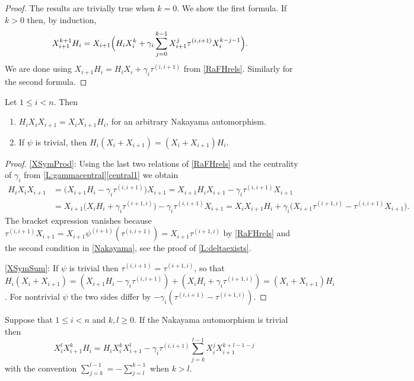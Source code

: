 \documentclass[a4paper,11pt]{amsart}
\numberwithin{equation}{subsection}
\theoremstyle{definition}
\theoremstyle{theorem}
\theoremstyle{remark}
\newcommand\taui[1][i]{\tau^{(#1)}}
\begin{document}
  \begin{proof}
   The results are trivially true when $k=0$. We show the first formula. If $k>0$ then, by induction,
      \begin{align*}
         X_{i+1}^{k+1}H_i
           &= X_{i+1}\Bigl( H_iX_i^k
           +\gamma_i\sum_{j=0}^{k-1}X_{i+1}^j\tau^{(i,i+1)}X_{i}^{k-j-1}\Bigr).
      \end{align*}
      We are done using  $X_{i+1}H_i=H_iX_i+\gamma_i\tau^{(i,i+1)}$  from
      \autoref{RaFHrels}. Similarly for the second formula.
  \end{proof}

 \begin{Lemma}\label{L:XSymmetric}
    Let $1\le i<n$. Then
    \begin{enumerate}
      \item\label{XSymProd} $H_iX_iX_{i+1}=X_iX_{i+1}H_i$, for an arbitrary
        Nakayama automorphism.
      \item\label{XSymSum} If $\psi$ is trivial, then $H_i(X_i+X_{i+1})=(X_i+X_{i+1})H_i$.
    \end{enumerate}
  \end{Lemma}
  \begin{proof}
    \autoref{XSymProd}: Using the last two relations of \autoref{RaFHrels} and the
    centrality of $\gamma_i$ from \autoref{L:gammacentral}\autoref{central1} we obtain
    \begin{align*}
      H_iX_iX_{i+1}
        &=\bigl(X_{i+1}H_i-\gamma_i\taui[i,i+1]\bigr)X_{i+1}
         =X_{i+1}H_iX_{i+1}-\gamma_i\taui[i,i+1]X_{i+1}\\
        &=X_{i+1}\bigl(X_iH_i+\gamma_i\taui[i+1,i]\bigr)-\gamma_i\taui[i,i+1]X_{i+1}
         =X_iX_{i+1}H_i+\gamma_i\bigl(X_{i+1}\taui[i+1,i]-\taui[i,i+1]X_{i+1}\bigr).
    \end{align*}
    The bracket expression vanishes because
    $\taui[i,i+1]X_{i+1}=X_{i+1}\psi^{(i+1)}(\taui[i,i+1])=X_{i+1}\taui[i+1,i]$
    by \autoref{RaFHrels} and the second condition in
    \autoref{Nakayama}, see the proof of \autoref{L:deltaexists}.

    \noindent\autoref{XSymSum}: If $\psi$ is
    trivial then $\taui[i,i+1]=\taui[i+1,i]$, so that
    $H_i(X_i+X_{i+1})=(X_{i+1}H_i-\gamma_i\taui[i,i+1])
       +(X_iH_i+\gamma_i\taui[i+1,i])=(X_i+X_{i+1})H_i$.
    For nontrivial $\psi$ the two sides differ by
    $-\gamma_i(\taui[i,i+1]-\taui[i+1,i])$.
  \end{proof}

  \begin{Corollary}\label{C:RewriteHX}
   Suppose that $1\le i<n$ and $k,l\ge0$.   If the Nakayama automorphism is trivial then
   \[X_i^lX_{i+1}^kH_i=H_iX_i^kX_{i+1}^l-\gamma_i\tau^{(i,i+1)}\sum_{j=k}^{l-1}X_i^jX_{i+1}^{k+l-1-j}\]
with the convention $\sum_{j=k}^{l-1}=-\sum_{j=l}^{k-1}$ when $k>l$.
  \end{Corollary}
\end{document}

